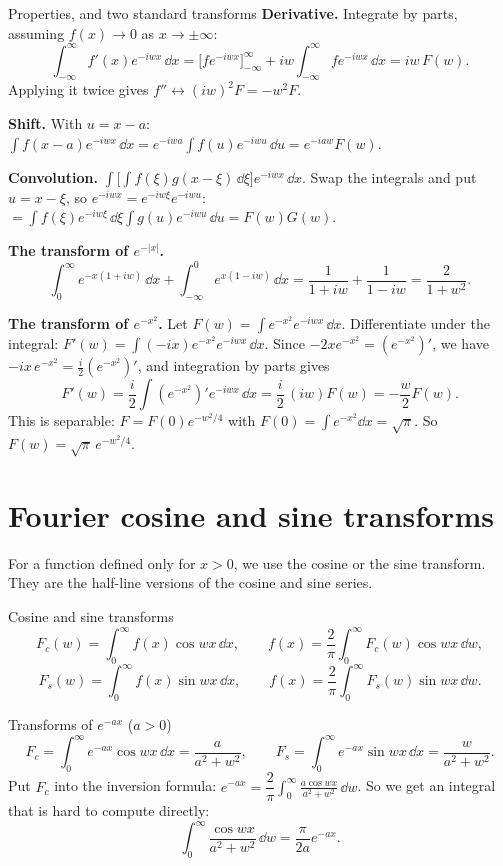 \begin{derivbox}{Properties, and two standard transforms}
\textbf{Derivative.} Integrate by parts, assuming $f(x)\to0$ as $x\to\pm\infty$:
\[ \int_{-\infty}^{\infty}f'(x)e^{-iwx}\,\dd x = \Big[f e^{-iwx}\Big]_{-\infty}^{\infty} + iw\int_{-\infty}^{\infty}f e^{-iwx}\,\dd x = iw\,F(w). \]
Applying it twice gives $f''\leftrightarrow(iw)^2F = -w^2F$.

\textbf{Shift.} With $u = x - a$: $\displaystyle\int f(x-a)e^{-iwx}\,\dd x = e^{-iwa}\int f(u)e^{-iwu}\,\dd u = e^{-iaw}F(w)$.

\textbf{Convolution.} $\displaystyle\int\Big[\int f(\xi)g(x-\xi)\,\dd\xi\Big]e^{-iwx}\,\dd x$. Swap the integrals and put $u = x-\xi$, so $e^{-iwx} = e^{-iw\xi}e^{-iwu}$:
$= \displaystyle\int f(\xi)e^{-iw\xi}\,\dd\xi\int g(u)e^{-iwu}\,\dd u = F(w)G(w)$.

\textbf{The transform of $e^{-|x|}$.}
\[ \int_0^\infty e^{-x(1+iw)}\,\dd x + \int_{-\infty}^0e^{x(1-iw)}\,\dd x = \frac{1}{1+iw} + \frac{1}{1-iw} = \frac{2}{1+w^2}. \]

\textbf{The transform of $e^{-x^2}$.} Let $F(w) = \int e^{-x^2}e^{-iwx}\,\dd x$. Differentiate under the integral: $F'(w) = \int(-ix)e^{-x^2}e^{-iwx}\,\dd x$. Since $-2xe^{-x^2} = (e^{-x^2})'$, we have $-ix\,e^{-x^2} = \frac i2(e^{-x^2})'$, and integration by parts gives
\[ F'(w) = \frac i2\int(e^{-x^2})'e^{-iwx}\,\dd x = \frac i2\,(iw)F(w) = -\frac w2F(w). \]
This is separable: $F = F(0)e^{-w^2/4}$ with $F(0) = \int e^{-x^2}\dd x = \sqrt\pi$. So $F(w) = \sqrt\pi\,e^{-w^2/4}$.
\end{derivbox}

\section{Fourier cosine and sine transforms}

For a function defined only for $x>0$, we use the cosine or the sine transform. They are the half-line versions of the cosine and sine series.

\begin{defbox}{Cosine and sine transforms}
\[ F_c(w) = \int_0^\infty f(x)\cos wx\,\dd x,\qquad f(x) = \frac2\pi\int_0^\infty F_c(w)\cos wx\,\dd w, \]
\[ F_s(w) = \int_0^\infty f(x)\sin wx\,\dd x,\qquad f(x) = \frac2\pi\int_0^\infty F_s(w)\sin wx\,\dd w. \]
\end{defbox}

\begin{examplebox}{Transforms of $e^{-ax}$ ($a>0$)}
\[ F_c = \int_0^\infty e^{-ax}\cos wx\,\dd x = \frac{a}{a^2+w^2},\qquad F_s = \int_0^\infty e^{-ax}\sin wx\,\dd x = \frac{w}{a^2+w^2}. \]
Put $F_c$ into the inversion formula: $e^{-ax} = \dfrac2\pi\displaystyle\int_0^\infty\frac{a\cos wx}{a^2+w^2}\,\dd w$. So we get an integral that is hard to compute directly:
\[ \int_0^\infty\frac{\cos wx}{a^2+w^2}\,\dd w = \frac{\pi}{2a}e^{-ax}. \]
\end{examplebox}

